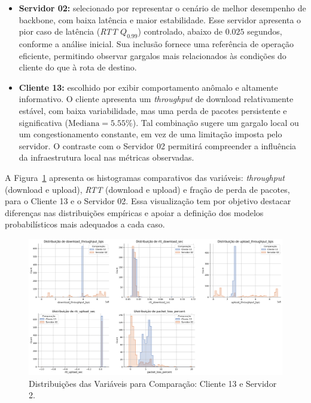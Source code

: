 \documentclass{article}
\begin{document}
\begin{itemize}
	\item \textbf{Servidor 02:} selecionado por representar o cenário de melhor desempenho de backbone, com baixa latência e maior estabilidade. Esse servidor apresenta o pior caso de latência (\textit{RTT} $Q_{0.99}$) controlado, abaixo de $0.025$ segundos, conforme a análise inicial. Sua inclusão fornece uma referência de operação eficiente, permitindo observar gargalos mais relacionados às condições do cliente do que à rota de destino.
	
	\item \textbf{Cliente 13:} escolhido por exibir comportamento anômalo e altamente informativo. O cliente apresenta um \textit{throughput} de download relativamente estável, com baixa variabilidade, mas uma perda de pacotes persistente e significativa ($\text{Mediana} = 5.55\%$). Tal combinação sugere um gargalo local ou um congestionamento constante, em vez de uma limitação imposta pelo servidor. O contraste com o Servidor 02 permitirá compreender a influência da infraestrutura local nas métricas observadas.
\end{itemize}

A Figura~\ref{fig:histogram_client_server} apresenta os histogramas comparativos das variáveis: \textit{throughput} (download e upload), \textit{RTT} (download e upload) e fração de perda de pacotes, para o Cliente 13 e o Servidor 02.  
Essa visualização tem por objetivo destacar diferenças nas distribuições empíricas e apoiar a definição dos modelos probabilísticos mais adequados a cada caso.

\begin{figure}[htp]
	\includegraphics[width=\textwidth]{../figures/eda/histogram_client_server.png}
	\caption{Distribuições das Variáveis para Comparação: Cliente 13 e Servidor 2.}
	\label{fig:histogram_client_server}
\end{figure}
\end{document}

